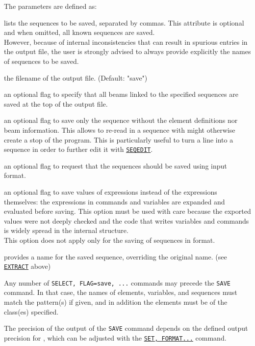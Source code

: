 The parameters are defined as: 
\begin{madlist}
	 lists the sequences to be saved, separated by commas. 
	This attribute is optional and when omitted, all known 
	sequences are saved. \\
	However, because of internal inconsistencies that can result in spurious 
	entries in the output file, the user is strongly advised to always provide 
	explicitly the names of sequences to be saved.

	 the filename of the output file. (Default: "save")

	 an optional flag to specify that all beams linked to the
	specified sequences are saved at the top of the output file.

	 an optional flag to save only the sequence without the
	element definitions nor beam information. This allows to re-read in a
	sequence with might otherwise create a stop of the program. This is
	particularly useful to turn a line into a sequence in order to further edit 
	it with \hyperref[sec:seqedit]{\texttt{SEQEDIT}}.

	 an optional flag to request that the sequences should be  
	saved using \madeight input format.

	 an optional flag to save values of expressions 
	instead of the expressions themselves: the expressions in commands 
	and variables are expanded and evaluated before saving.
	This option must be used with care because the exported values were not deeply
	checked and the code that writes variables and commands is widely spread
	in the internal structure. \\
	This option does not apply only for the saving of sequences in \madeight format. 

	 provides a name for the saved sequence, overriding the 
	original name. (see \hyperref[sec:extract]{\texttt{EXTRACT}} above)
\end{madlist}

Any number of \texttt{SELECT, FLAG=save, ...} commands may precede
the \texttt{SAVE} command. In that case, the names of elements, variables, and
sequences must match the pattern(s) if given, and in addition the
elements must be of the class(es) specified. 


The precision of the output of the \texttt{SAVE} command depends on the
defined output precision for \madx, which can be adjusted with the 
\hyperref[sec:set]{\texttt{SET, FORMAT...}} command.

